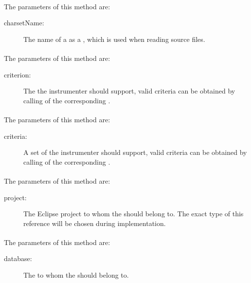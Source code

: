\paragraph{} \label{Classes:Instrumentation:InstrumenterFactory:setCharset_name}
The parameters of this method are:
\begin{description}
\item[charsetName:] The name of a  as a , which is used when reading source files.
\end{description}
\paragraph{} \label{Classes:Instrumentation:InstrumenterFactory:addCriterion}
The parameters of this method are:
\begin{description}
\item[criterion:] The  the instrumenter should support, valid criteria can be obtained by calling  of the corresponding .
\end{description}
\paragraph{} \label{Classes:Instrumentation:InstrumenterFactory:addCriteria}
The parameters of this method are:
\begin{description}
\item[criteria:] A set of  the instrumenter should support, valid criteria can be obtained by calling  of the corresponding .
\end{description}
\paragraph{} \label{Classes:Instrumentation:InstrumenterFactory:setProject}
The parameters of this method are:
\begin{description}
\item[project:] The Eclipse project to whom the  should belong to. The exact type of this reference will be chosen during implementation.
\end{description}
\paragraph{} \label{Classes:Instrumentation:InstrumenterFactory:setDatabase}
The parameters of this method are:
\begin{description}
\item[database:] The  to whom the  should belong to.
\end{description}

